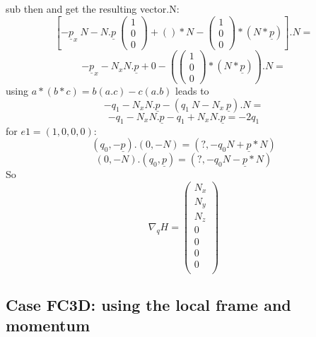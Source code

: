 sub then and get the resulting vector.N:
\[\left[ -\underline p_x~N -N.\underline p~\left(\begin{array}{c}1\\0\\0\end{array}\right)+()*N-\left(\begin{array}{c}1\\0\\0\end{array}\right)*(N*\underline p)\right].N=\]
\[-\underline p_x-N_xN.\underline p+0-(\left(\begin{array}{c}1\\0\\0\end{array}\right)*(N*\underline p)).N=\]
  using $a*(b*c)=b(a.c)-c(a.b)$ leads to
  \[-q_1-N_xN.\underline p-(q_1~N-N_x~\underline p).N=\]
\[-q_1-N_xN.\underline p-q_1+N_xN.\underline p=-2q_1\]
for $e1=(1,0,0,0)$:
\[(q_0,-\underline p).(0,-N)=(?,-q_0N+\underline p*N)\]
\[(0,-N).(q_0,\underline p)=(?,-q_0N-\underline p*N)\]
So
\[\nabla _q H =\left(\begin{array}{c} N_x\\N_y\\N_z\\
0\\
0\\
0\\
0\\
\end{array}\right)\]

\subsection{Case FC3D: using the local frame and momentum}

